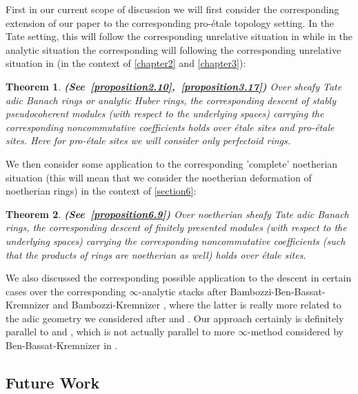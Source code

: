 \documentclass[12pt]{amsart}
\newtheorem{theorem}{Theorem}[section]
\theoremstyle{definition}
\numberwithin{equation}{section}
\begin{document}
\indent First in our current scope of discussion we will first consider the corresponding extension of our paper \cite{TX2} to the corresponding pro-\'etale topology setting. In the Tate setting, this will follow the corresponding unrelative situation in \cite{KL2} while in the analytic situation the corresponding will following the corresponding unrelative situation in \cite{Ked1} (in the context of \cref{chapter2} and \cref{chapter3}):


\begin{theorem} \mbox{\bf{(See \cref{proposition2.10}, \cref{proposition3.17})}}
Over sheafy Tate adic Banach rings or analytic Huber rings, the corresponding descent of stably pseudocoherent modules (with respect to the underlying spaces) carrying the corresponding noncommutative coefficients holds over \'etale sites and pro-\'etale sites. Here for pro-\'etale sites we will consider only perfectoid rings. 	
\end{theorem}


 
\indent We then consider some application to the corresponding 'complete' noetherian situation (this will mean that we consider the noetherian deformation of noetherian rings) in the context of \cref{section6}:


\begin{theorem} \mbox{\bf{(See \cref{proposition6.9})}} 
Over noetherian sheafy Tate adic Banach rings, the corresponding descent of finitely presented modules (with respect to the underlying spaces) carrying the corresponding noncommutative coefficients (such that the products of rings are noetherian as well) holds over \'etale sites.   	
\end{theorem}





\indent We also discussed the corresponding possible application to the descent in certain cases over the corresponding $\infty$-analytic stacks after Bambozzi-Ben-Bassat-Kremnizer \cite{BBBK} and Bambozzi-Kremnizer \cite{BK}, where the latter is really more related to the adic geometry we considered after \cite{KL1} and \cite{KL2}. Our approach certainly is definitely parallel to \cite{KL1} and \cite{KL2}, which is not actually parallel to more $\infty$-method considered by Ben-Bassat-Kremnizer in \cite{BBK}. 


\subsection{Future Work}
\end{document}
